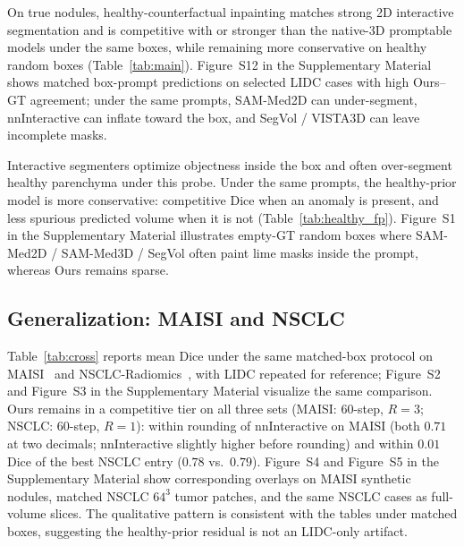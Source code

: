 \documentclass[twoside]{article}
\newcommand{\suppFigQualFP}{Figure~S1}
\newcommand{\suppFigBench}{Figure~S2}
\newcommand{\suppFigBenchPer}{Figure~S3}
\newcommand{\suppFigQualCross}{Figure~S4}
\newcommand{\suppFigQualNSCLC}{Figure~S5}
\newcommand{\suppFigQualLIDC}{Figure~S12}
\begin{document}
On true nodules, healthy-counterfactual inpainting matches strong
2D interactive segmentation and is competitive with or stronger than
the native-3D promptable models under the same boxes, while remaining
more conservative on healthy random boxes
(Table~\ref{tab:main}).
\suppFigQualLIDC{} in the Supplementary Material shows matched
box-prompt predictions on selected LIDC cases with high Ours--GT
agreement; under the same prompts, SAM-Med2D can under-segment,
nnInteractive can inflate toward the box, and SegVol / VISTA3D can
leave incomplete masks.

Interactive segmenters optimize objectness inside the box and often
over-segment healthy parenchyma under this probe. Under the same prompts,
the healthy-prior model is more conservative: competitive Dice when an
anomaly is present, and less spurious predicted volume when it is not
(Table~\ref{tab:healthy_fp}).
\suppFigQualFP{} in the Supplementary Material illustrates empty-GT
random boxes where SAM-Med2D / SAM-Med3D / SegVol often paint lime masks
inside the prompt, whereas Ours remains sparse.

\subsection{Generalization: MAISI and NSCLC}
Table~\ref{tab:cross} reports mean Dice under the same matched-box
protocol on MAISI~\citep{maisi2025} and
NSCLC-Radiomics~\citep{aerts2014nsclc}, with LIDC repeated for
reference; \suppFigBench{} and \suppFigBenchPer{} in the Supplementary
Material visualize the same comparison.
Ours remains in a competitive tier on all three sets
(MAISI: \(60\)-step, \(R{=}3\); NSCLC: \(60\)-step, \(R{=}1\)): within
rounding of nnInteractive on MAISI (both \(0.71\) at two decimals;
nnInteractive slightly higher before rounding) and within \(0.01\) Dice
of the best NSCLC entry (\(0.78\) vs.\ \(0.79\)).
\suppFigQualCross{} and \suppFigQualNSCLC{} in the Supplementary Material
show corresponding overlays on MAISI synthetic nodules, matched NSCLC
\(64^3\) tumor patches, and the same NSCLC cases as full-volume slices.
The qualitative pattern is consistent with the tables under matched
boxes, suggesting the healthy-prior residual is not an LIDC-only
artifact.
\end{document}
